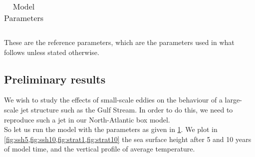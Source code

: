 \begin{table}[H]
\begin{tabular}{|c|c|c|c|}
             \hline
		\end{tabular}
		\caption{Model Parameters}
		           	\label{table:parameters}
\end{table}
These are the reference parameters, which are the parameters used in what follows unless stated otherwise. 

\subsection{Preliminary results}

We wish to study the effects of small-scale eddies on the behaviour of a large-scale jet structure such as the Gulf Stream. In order to do this, we need to reproduce such a jet in our North-Atlantic box model. \\
\linebreak
So let us run the model with the parameters as given in \cref{table:parameters}. We plot in \cref{fig:ssh5,fig:ssh10,fig:strat1,fig:strat10} the sea surface height after 5 and 10 years of model time, and the vertical profile of average temperature. 

